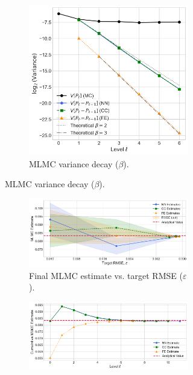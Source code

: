 \begin{figure}[htbp]
\begin{subfigure}{\textwidth}
\begin{subfigure}[b]{0.48\textwidth}
            \centering
            \includegraphics[width=\linewidth]{graphics/she_energy_var_decay.png}
            \caption{MLMC variance decay ($\beta$).}
            \label{fig:energy_variance_decay}
        \end{subfigure}
    \end{subfigure}
    \vspace{1cm}
    \begin{subfigure}{\textwidth}
        \centering
        \begin{subfigure}[b]{\textwidth}
            \centering
            \includegraphics[width=0.7\linewidth]{graphics/she_energy_conv.png}
            \caption{Final MLMC estimate vs. target RMSE ($\varepsilon$).}
            \label{fig:energy_conv_vs_eps}
        \end{subfigure}
        \vspace{0.5cm}
        \begin{subfigure}[b]{\textwidth}
            \centering
            \includegraphics[width=0.7\linewidth]{graphics/she_energy_cumconv.png}

\end{subfigure}
\end{subfigure}
\end{figure}
